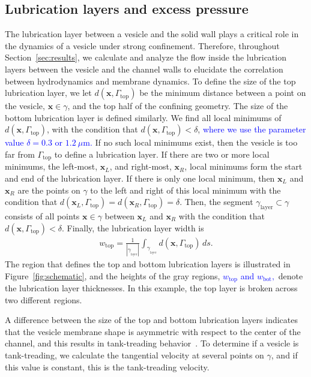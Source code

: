 \documentclass[twoside,twocolumn,9pt]{article}
\newcommand{\xx}{\mathbf{x}}
\begin{document}
\subsection{\label{sec:LL} Lubrication layers and excess pressure}
The lubrication layer between a vesicle and the solid wall plays a
critical role in the dynamics of a vesicle under strong confinement.
Therefore, throughout Section~\ref{sec:results}, we calculate and
analyze the flow inside the lubrication layers between the vesicle and
the channel walls to elucidate the correlation between hydrodynamics and
membrane dynamics. To define the size of the top lubrication layer, we
let $d(\xx,\Gamma_\mathrm{top})$ be the minimum distance between a point
on the vesicle, $\xx \in \gamma$, and the top half of the confining
geometry. The size of the bottom lubrication layer is defined similarly.
We find all local minimums of $d(\xx,\Gamma_\mathrm{top})$, with the
condition that $d(\xx,\Gamma_\mathrm{top}) < \delta$, 
\textcolor{blue}{
  where we use the parameter value $\delta = 0.3$ or $1.2~\mu$m.
}
If no such local minimums exist, then the vesicle is too
far from $\Gamma_\mathrm{top}$ to define a lubrication layer. If there
are two or more local minimums, the left-most, $\xx_L$, and right-most,
$\xx_R$, local minimums form the start and end of the lubrication layer.
If there is only one local minimum, then $\xx_L$ and $\xx_R$ are the
points on $\gamma$ to the left and right of this local minimum with the
condition that $d(\xx_L,\Gamma_\mathrm{top}) =
d(\xx_R,\Gamma_\mathrm{top}) = \delta$. Then, the segment
$\gamma_{\mathrm{layer}} \subset \gamma$ consists of all points $\xx \in
\gamma$ between $\xx_L$ and $\xx_R$ with the condition that
$d(\xx,\Gamma_\mathrm{top}) < \delta$. Finally, the lubrication layer
width is
\begin{align}
  w_\mathrm{top} = \frac{1}{|\gamma_{_\mathrm{layer}}|} 
    \int_{\gamma_{_\mathrm{layer}}} d(\xx,\Gamma_\mathrm{top}) \, ds.
\end{align}
The region that defines the top and bottom lubrication layers is
illustrated in Figure~\ref{fig:schematic}, and the heights of the gray
regions, 
\textcolor{blue}{
$w_{\mathrm{top}}$ and $w_{\mathrm{bot}},$
}
denote the lubrication layer thicknesses. In this example, the top layer
is broken across two different regions.

A difference between the size of the top and bottom lubrication layers
indicates that the vesicle membrane shape is asymmetric with respect to
the center of the channel, and this results in tank-treading
behavior~\cite{aga-bir2020}. To determine if a vesicle is tank-treading,
we calculate the tangential velocity at several points on $\gamma$, and
if this value is constant, this is the tank-treading velocity.
\end{document}
